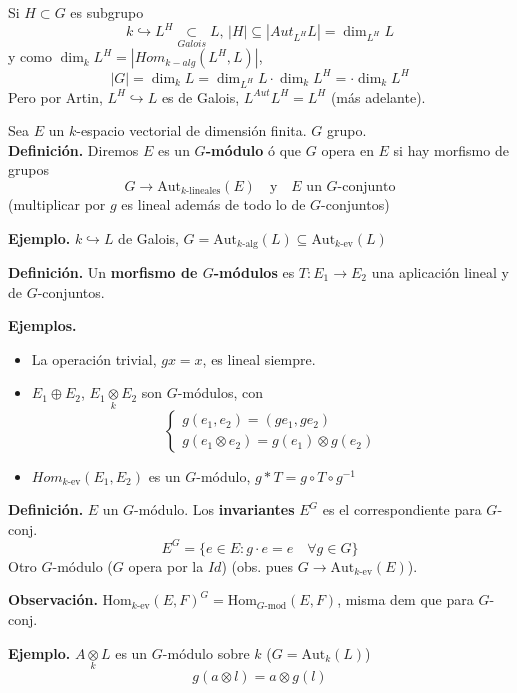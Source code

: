 Si $H \subset G$ es subgrupo
$$k \hookrightarrow L^H \underset{Galois}{\subset} L, \, |H| \subseteq | Aut_{L^H} L | = \dim_{L^H} L$$
y como $\dim_{k} L^H = |Hom_{k-alg}(L^H, L)|$, 
$$|G| = \dim_k L = \dim_{L^H} L \cdot \dim_k L^H =  \cdot \dim_k L^H$$
Pero por Artin, $L^H \hookrightarrow L$ es de Galois, $L^{Aut} L^H = L^H$ (m\'as adelante).

Sea $E$ un $k$-espacio vectorial de dimensi\'on finita. $G$ grupo. \\ \textbf{Definici\'on.} Diremos $E$ es un \textbf{$G$-módulo} \'o que $G$ opera en $E$ si hay morfismo de grupos
\[ G \longrightarrow \text{Aut}_{k\text{-lineales}}(E) \quad \text{y} \quad E \text{ un } G\text{-conjunto} \]
(multiplicar por $g$ es lineal además de todo lo de $G$-conjuntos)

\noindent \textbf{Ejemplo.} $k \hookrightarrow L$ de Galois, $G = \text{Aut}_{k\text{-alg}}(L) \subseteq \text{Aut}_{k\text{-ev}}(L)$

\noindent \textbf{Definici\'on.} Un \textbf{morfismo de $G$-módulos} es $T : E_1 \longrightarrow E_2$ una aplicación lineal y de $G$-conjuntos.

\noindent \textbf{Ejemplos.}
\begin{itemize}
    \item La operación trivial, $gx = x$, es lineal siempre.
    \item $E_1 \oplus E_2$, $E_1 \underset{k}{\otimes} E_2$ son $G$-módulos, con
    \[ \begin{cases} g(e_1, e_2) = (ge_1, ge_2) \\ g(e_1 \otimes e_2) = g(e_1) \otimes g(e_2) \end{cases} \]
    \item $Hom_{k\text{-ev}}(E_1, E_2)$ es un $G$-módulo, $g * T = g \circ T \circ g^{-1}$
\end{itemize}

\noindent \textbf{Definici\'on.} $E$ un $G$-módulo. Los \textbf{invariantes} $E^G$ es el correspondiente para $G$-conj.
\[ E^G = \{ e \in E : g \cdot e = e \quad \forall g \in G \} \]
Otro $G$-módulo ($G$ opera por la $Id$) (obs. pues $G \longrightarrow \text{Aut}_{k\text{-ev}}(E)$).

\vspace{0.2cm}

\noindent \textbf{Observaci\'on.}  $\text{Hom}_{k\text{-ev}}(E, F)^G = \text{Hom}_{G\text{-mod}}(E, F)$, misma dem que para $G$-conj.

\noindent \textbf{Ejemplo.} $A \underset{k}{\otimes} L$ es un $G$-módulo sobre $k$ ($G = \text{Aut}_k(L)$)
\[ g(a \otimes l) = a \otimes g(l) \]

